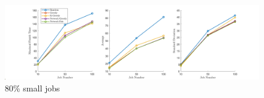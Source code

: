 \begin{figure}[bth]
\includegraphics[width=1\textwidth]{figure/80.png}
\centering
\caption{80\% small jobs} \label{fig-80}
\end{figure}